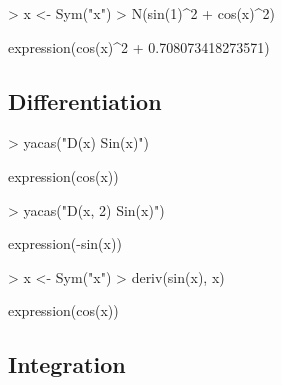 \documentclass[10pt]{article}
\begin{document}
\begin{Schunk}
\begin{Sinput}
> x <- Sym("x")
> N(sin(1)^2 + cos(x)^2)
\end{Sinput}
\begin{Soutput}
expression(cos(x)^2 + 0.708073418273571)
\end{Soutput}
\end{Schunk}





\subsection{Differentiation}
\label{sec:differentiation}

\begin{Schunk}
\begin{Sinput}
> yacas("D(x) Sin(x)")
\end{Sinput}
\begin{Soutput}
expression(cos(x))
\end{Soutput}
\begin{Sinput}
> yacas("D(x, 2) Sin(x)")
\end{Sinput}
\begin{Soutput}
expression(-sin(x))
\end{Soutput}
\end{Schunk}

\begin{Schunk}
\begin{Sinput}
> x <- Sym("x")
> deriv(sin(x), x)
\end{Sinput}
\begin{Soutput}
expression(cos(x))
\end{Soutput}
\end{Schunk}


\subsection{Integration}
\label{sec:integration}
\end{document}
